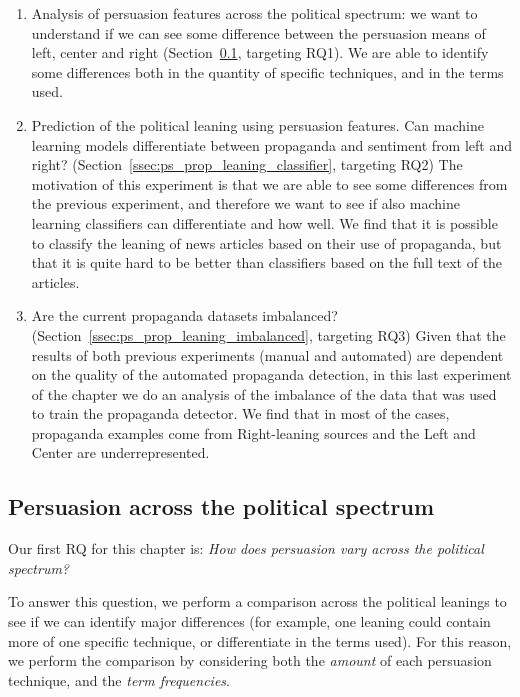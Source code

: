 \begin{enumerate}
    \item Analysis of persuasion features across the political spectrum: we want to understand if we can see some difference between the persuasion means of left, center and right (Section~\ref{ssec:ps_prop_leaning_across}, targeting RQ1). We are able to identify some differences both in the quantity of specific techniques, and in the terms used.
    \item Prediction of the political leaning using persuasion features. Can machine learning models differentiate between propaganda and sentiment from left and right? (Section~\ref{ssec:ps_prop_leaning_classifier}, targeting RQ2) The motivation of this experiment is that we are able to see some differences from the previous experiment, and therefore we want to see if also machine learning classifiers can differentiate and how well. We find that it is possible to classify the leaning of news articles based on their use of propaganda, but that it is quite hard to be better than classifiers based on the full text of the articles. 
    \item Are the current propaganda datasets imbalanced? (Section~\ref{ssec:ps_prop_leaning_imbalanced}, targeting RQ3) Given that the results of both previous experiments (manual and automated) are dependent on the quality of the automated propaganda detection, in this last experiment of the chapter we do an analysis of the imbalance of the data that was used to train the propaganda detector. We find that in most of the cases, propaganda examples come from Right-leaning sources and the Left and Center are underrepresented.
\end{enumerate}

\subsection{\statusgreen Persuasion across the political spectrum}
\label{ssec:ps_prop_leaning_across}

Our first RQ for this chapter is: \emph{How does persuasion vary across the political spectrum?}

To answer this question, we perform a comparison across the political leanings to see if we can identify major differences (for example, one leaning could contain more of one specific technique, or differentiate in the terms used).
For this reason, we perform the comparison by considering both the \emph{amount} of each persuasion technique, and the \emph{term frequencies}.

